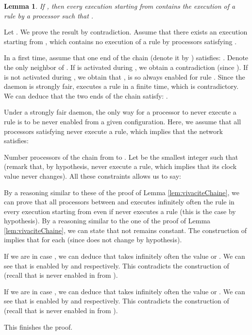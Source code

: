 \documentclass[11pt,english,letterpaper]{article}
\newtheorem{lemma}{Lemma}
\newenvironment{proof}{{\noindent\bf Proof. } }{{\hfill }}
\begin{document}
\begin{lemma}\label{lem:prelem2ConvergenceChaine}	
If , then every execution starting from  contains the execution of a rule by a processor  such that .
\end{lemma}

\begin{proof}
Let . We prove the result by contradiction. Assume that there exists an execution  starting from , which contains no execution of a rule by processors  satisfying .

In a first time, assume that one end of the chain (denote it by ) satisfies: . Denote  the only neighbor of . If  is activated during , we obtain a contradiction (since ). If  is not activated during , we obtain that ,  is so always enabled for rule . Since the daemon is strongly fair,  executes a rule in a finite time, which is contradictory. We can deduce that the two ends of the chain satisfy: .

Under a strongly fair daemon, the only way for a processor to never execute a rule is to be never enabled from a given configuration. Here, we assume that all processors  satisfying  never execute a rule, which implies that the network satisfies:


Number processors of the chain from  to . Let  be the smallest integer such that  (remark that, by hypothesis,  never execute a rule, which implies that its clock value never changes). All these constraints allows us to say:


By a reasoning similar to these of the proof of Lemma \ref{lem:vivaciteChaine}, we can prove that all processors between  and  executes infinitely often the rule  in every execution starting from  even if  never executes a rule (this is the case by hypothesis). By a reasoning similar to the one of the proof of Lemma \ref{lem:vivaciteChaine}, we can state that  not remains constant. The construction of  implies that   for each  (since  does not change by hypothesis).

If we are in case , we can deduce that  takes infinitely often the value  or . We can see that  is enabled by  and  respectively. This contradicts the construction of  (recall that  is never enabled in  from ).

If we are in case , we can deduce that   takes infinitely often the value  or . We can see that  is enabled by  and  respectively. This contradicts the construction of  (recall that  is never enabled in  from ).
				
This finishes the proof.
\end{proof}
\end{document}
